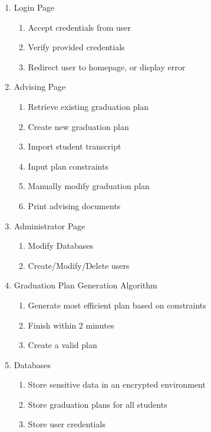 \documentclass[letterpaper]{report}
\begin{document}
	\begin{enumerate}
		\item Login Page
		\begin{enumerate}
			\item Accept credentials from user
			\item Verify provided credentials
			\item Redirect user to homepage, or display error
		\end{enumerate}
	
		\item Advising Page
		\begin{enumerate}
			\item Retrieve existing graduation plan
			\item Create new graduation plan
			\item Import student transcript
			\item Input plan constraints
			\item Manually modify graduation plan
			\item Print advising documents
		\end{enumerate}	
	
		\item Administrator Page
		\begin{enumerate}
			\item Modify Databases
			\item Create/Modify/Delete users\\
		\end{enumerate}
	
		\item Graduation Plan Generation Algorithm
		\begin{enumerate}
			\item Generate most efficient plan based on constraints
			\item Finish within 2 minutes
			\item Create a valid plan
		\end{enumerate}
	
		\item Databases
		\begin{enumerate}
			\item Store sensitive data in an encrypted environment
			\item Store graduation plans for all students
			\item Store user credentials
		\end{enumerate}
	\end{enumerate}
\end{document}
